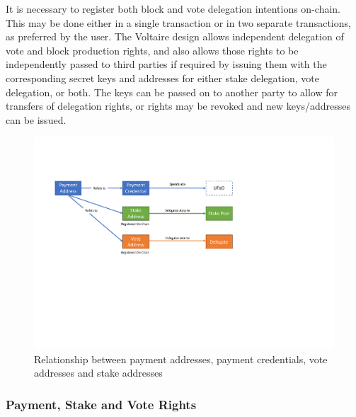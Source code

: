 It is necessary to register both block and vote delegation intentions on-chain.  This may be done either in a single transaction or in two separate transactions,
as preferred by the user.  The Voltaire design allows independent delegation of vote and block production rights,
and also allows those rights to be independently passed to third parties if required by issuing them with the corresponding secret keys and addresses for either stake delegation, vote delegation, or both.
The keys can be passed on to another party to allow for transfers of delegation rights, or rights may be revoked and new keys/addresses can be issued.

\begin{figure}[h]
  \begin{center}
  \includegraphics[trim=0 250 150 80,clip,width=\textwidth]{Indirection}
  \end{center}
  \caption{Relationship between payment addresses, payment credentials, vote addresses and stake addresses}
  \label{fig:indirection}
\end{figure}

\subsubsection*{Payment, Stake and Vote Rights}

